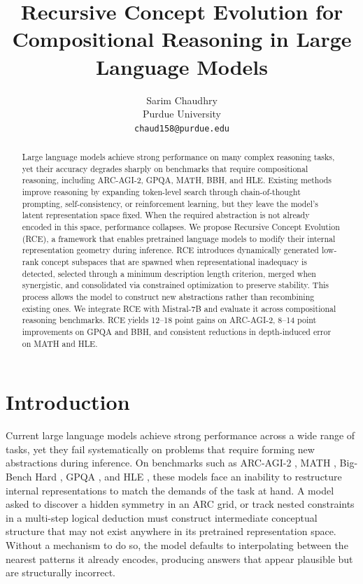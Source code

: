 \documentclass[11pt]{article}
\title{Recursive Concept Evolution for Compositional Reasoning in Large Language Models}
\author{
  Sarim Chaudhry\\
  Purdue University\\
  \texttt{chaud158@purdue.edu}
}
\date{}
\begin{document}
\maketitle

\begin{abstract}
Large language models achieve strong performance on many complex reasoning tasks, yet their accuracy degrades sharply on benchmarks that require compositional reasoning, including ARC-AGI-2, GPQA, MATH, BBH, and HLE. Existing methods improve reasoning by expanding token-level search through chain-of-thought prompting, self-consistency, or reinforcement learning, but they leave the model’s latent representation space fixed. When the required abstraction is not already encoded in this space, performance collapses. We propose Recursive Concept Evolution (RCE), a framework that enables pretrained language models to modify their internal representation geometry during inference. RCE introduces dynamically generated low-rank concept subspaces that are spawned when representational inadequacy is detected, selected through a minimum description length criterion, merged when synergistic, and consolidated via constrained optimization to preserve stability. This process allows the model to construct new abstractions rather than recombining existing ones. We integrate RCE with Mistral-7B and evaluate it across compositional reasoning benchmarks. RCE yields 12–18 point gains on ARC-AGI-2, 8–14 point improvements on GPQA and BBH, and consistent reductions in depth-induced error on MATH and HLE.
\end{abstract}

\section{Introduction}

Current large language models achieve strong performance across a wide range of tasks, yet they fail systematically on problems that require forming new abstractions during inference. On benchmarks such as ARC-AGI-2 \cite{chollet2019measure}, MATH \cite{hendrycks2021math}, Big-Bench Hard \cite{suzgun2023bbh}, GPQA \cite{rein2024gpqa}, and HLE \cite{phan2025hle}, these models face an inability to restructure internal representations to match the demands of the task at hand. A model asked to discover a hidden symmetry in an ARC grid, or track nested constraints in a multi-step logical deduction must construct intermediate conceptual structure that may not exist anywhere in its pretrained representation space. Without a mechanism to do so, the model defaults to interpolating between the nearest patterns it already encodes, producing answers that appear plausible but are structurally incorrect.
\end{document}
